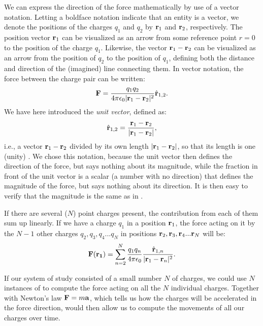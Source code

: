 We can express the direction of the force mathematically by use of a vector notation. Letting a boldface notation indicate that an entity is a vector, we denote the positions of the charges $q_1$ and $q_2$ by ${\bf r}_1$ and ${\bf r}_2$, respectively. The position vector ${\bf r}_1$ can be visualized as an arrow from some reference point $r=0$ to the position of the charge $q_1$. Likewise, the vector ${\bf r}_1-{\bf r}_2$ can be visualized as an arrow from the position of $q_2$ to the position of $q_1$, defining both the distance and direction of the (imagined) line connecting them. In vector notation, the force between the charge pair can be written:
\begin{equation}
{\bf F} = \frac{q_1q_2}{4\pi \epsilon_0 |{\bf r}_1-{\bf r}_2|^2} \hat{{\bf r}}_{1,2}.
\label{eq:Basics:CoulombFvec}
\end{equation}
We have here introduced the \textit{unit vector}, defined as: 
\begin{equation}
\hat{{\bf r}}_{1,2} = \frac{{\bf r}_1 - {\bf r}_2}{|{\bf r}_1-{\bf r}_2|}, 
\label{eq:Basics:UnitVector}
\end{equation}
i.e., a vector ${\bf r}_1-{\bf r}_2$ divided by its own length $|{\bf r}_1-{\bf r}_2|$, so that its length is one (unity) . We chose this notation, because the unit vector then defines the direction of the force, but says nothing about its magnitude, while the fraction in front of the unit vector is a scalar (a number with no direction) that defines the magnitude of the force, but  says nothing about its direction. It is then easy to verify that the magnitude is the same as in .

If there are several ($N$) point charges present, the contribution from each of them sum up linearly. If we have a charge $q_1$ in a position ${\bf r}_1$, the force acting on it by the $N-1$ other charges $q_2, q_3, q_4 ... q_{N}$ in positions ${\bf r}_2, {\bf r}_3, {\bf r}_4 ... {\bf r}_{N}$ will be:
\begin{equation}
{\bf F}({\bf r_1}) = \sum_{n=2}^{N} \frac{q_1 q_n}{4\pi \epsilon_0} \frac{\hat{{\bf r}}_{1,n}}{|{\bf r}_1-{\bf r}_n|^2}.
\label{eq:Basics:CoulombFN}
\end{equation}

If our system of study consisted of a small number $N$ of charges, we could use $N$ instances of  to compute the force acting on all the $N$ individual charges. Together with Newton's law ${\bf F} = m {\bf a}$, which tells us how the charges will be accelerated in the force direction,  would then allow us to compute the movements of all our charges over time. 


